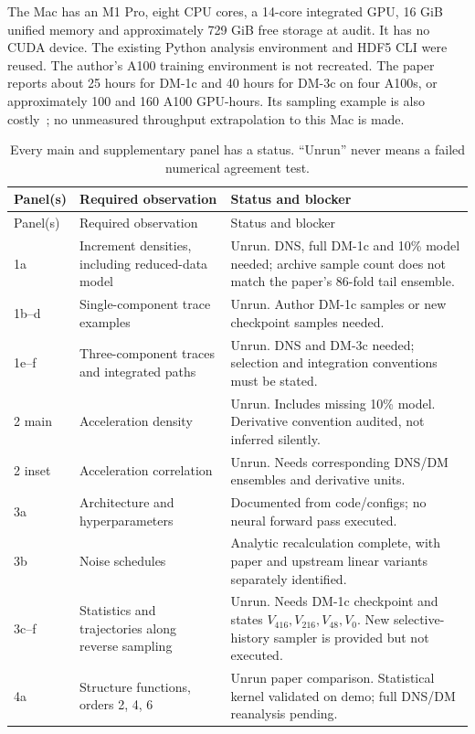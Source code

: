 \documentclass[10pt,a4paper]{article}
\begin{document}
The Mac has an M1 Pro, eight CPU cores, a 14-core integrated GPU, 16 GiB unified memory and approximately 729 GiB free storage at audit. It has no CUDA device. The existing Python analysis environment and HDF5 CLI were reused. The author's A100 training environment is not recreated. The paper reports about 25 hours for DM-1c and 40 hours for DM-3c on four A100s, or approximately 100 and 160 A100 GPU-hours. Its sampling example is also costly\ \cite{li2024}; no unmeasured throughput extrapolation to this Mac is made.

\small
\begin{longtable}{L{15mm}L{47mm}L{85mm}}
\caption{Every main and supplementary panel has a status. ``Unrun'' never means a failed numerical agreement test.}\label{tab:inventory}\\
\toprule Panel(s) & Required observation & Status and blocker\\\midrule
\endfirsthead
\toprule Panel(s) & Required observation & Status and blocker\\\midrule
\endhead
1a & Increment densities, including reduced-data model & Unrun. DNS, full DM-1c and 10\% model needed; archive sample count does not match the paper's 86-fold tail ensemble.\\
1b--d & Single-component trace examples & Unrun. Author DM-1c samples or new checkpoint samples needed.\\
1e--f & Three-component traces and integrated paths & Unrun. DNS and DM-3c needed; selection and integration conventions must be stated.\\
2 main & Acceleration density & Unrun. Includes missing 10\% model. Derivative convention audited, not inferred silently.\\
2 inset & Acceleration correlation & Unrun. Needs corresponding DNS/DM ensembles and derivative units.\\
3a & Architecture and hyperparameters & Documented from code/configs; no neural forward pass executed.\\
3b & Noise schedules & Analytic recalculation complete, with paper and upstream linear variants separately identified.\\
3c--f & Statistics and trajectories along reverse sampling & Unrun. Needs DM-1c checkpoint and states $V_{416},V_{216},V_{48},V_0$. New selective-history sampler is provided but not executed.\\
4a & Structure functions, orders 2, 4, 6 & Unrun paper comparison. Statistical kernel validated on demo; full DNS/DM reanalysis pending.\\

\end{longtable}
\end{document}
